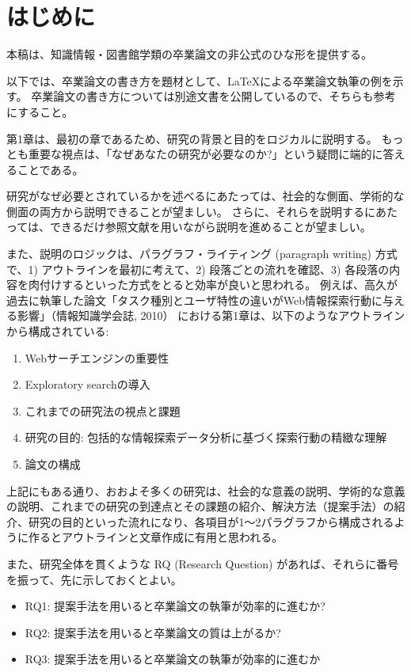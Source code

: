 \chapter{はじめに}
\label{chap:introduction}

本稿は、知識情報・図書館学類の卒業論文の非公式のひな形を提供する。

以下では、卒業論文の書き方を題材として、\LaTeX による卒業論文執筆の例を示す。
卒業論文の書き方については別途文書を公開しているので、そちらも参考にすること\cite{takaku:howto}。

第1章は、最初の章であるため、研究の背景と目的をロジカルに説明する。
もっとも重要な視点は、「なぜあなたの研究が必要なのか?」という疑問に端的に答えることである\cite{sakai:2015:korekara}。

研究がなぜ必要とされているかを述べるにあたっては、社会的な側面、学術的な側面の両方から説明できることが望ましい。
さらに、それらを説明するにあたっては、できるだけ参照文献を用いながら説明を進めることが望ましい。

また、説明のロジックは、パラグラフ・ライティング (paragraph writing) 方式で、1) アウトラインを最初に考えて、2) 段落ごとの流れを確認、3) 各段落の内容を肉付けするといった方式をとると効率が良いと思われる。
例えば、高久が過去に執筆した論文「タスク種別とユーザ特性の違いがWeb情報探索行動に与える影響」（情報知識学会誌, 2010）\cite{takaku:2010:jsik} における第1章は、以下のようなアウトラインから構成されている:

\begin{enumerate}
    \item Webサーチエンジンの重要性
    \item Exploratory searchの導入
    \item これまでの研究法の視点と課題
    \item 研究の目的: 包括的な情報探索データ分析に基づく探索行動の精緻な理解
    \item 論文の構成
\end{enumerate}

上記にもある通り、おおよそ多くの研究は、社会的な意義の説明、学術的な意義の説明、これまでの研究の到達点とその課題の紹介、解決方法（提案手法）の紹介、研究の目的といった流れになり、各項目が1～2パラグラフから構成されるように作るとアウトラインと文章作成に有用と思われる。

また、研究全体を貫くような RQ (Research Question) があれば、それらに番号を振って、先に示しておくとよい。

\begin{itemize}
    \item RQ1: 提案手法を用いると卒業論文の執筆が効率的に進むか?
    \item RQ2: 提案手法を用いると卒業論文の質は上がるか?
    \item RQ3: 提案手法を用いると卒業論文の執筆が効率的に進むか
\end{itemize}
